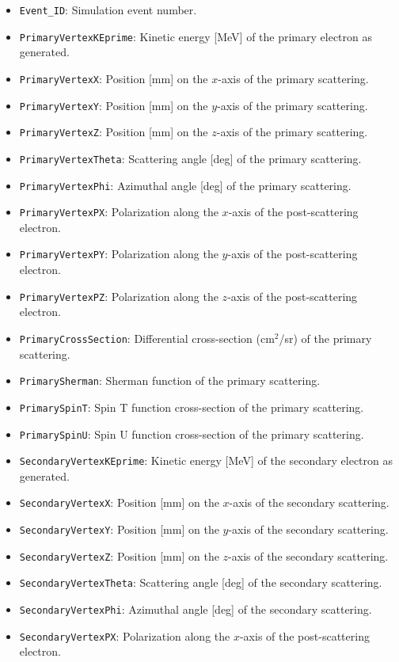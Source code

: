 \documentclass[11pt]{article}
\begin{document}
\begin{itemize}
 \item \texttt{Event\_ID}: Simulation event number.
 \item \texttt{PrimaryVertexKEprime}: Kinetic energy [MeV] of the primary electron as generated.
 \item \texttt{PrimaryVertexX}: Position [mm] on the $x$-axis of the primary scattering.
 \item \texttt{PrimaryVertexY}: Position [mm] on the $y$-axis of the primary scattering.
 \item \texttt{PrimaryVertexZ}: Position [mm] on the $z$-axis of the primary scattering.
 \item \texttt{PrimaryVertexTheta}: Scattering angle [deg] of the primary scattering.
 \item \texttt{PrimaryVertexPhi}: Azimuthal angle [deg] of the primary scattering.
 \item \texttt{PrimaryVertexPX}: Polarization along the $x$-axis of the post-scattering electron.
 \item \texttt{PrimaryVertexPY}: Polarization along the $y$-axis of the post-scattering electron.
 \item \texttt{PrimaryVertexPZ}: Polarization along the $z$-axis of the post-scattering electron.
 \item \texttt{PrimaryCrossSection}: Differential cross-section (cm$^2$/sr) of the primary scattering.
 \item \texttt{PrimarySherman}: Sherman function of the primary scattering.
 \item \texttt{PrimarySpinT}: Spin T function cross-section of the primary scattering.
 \item \texttt{PrimarySpinU}: Spin U function cross-section of the primary scattering.
 \item \texttt{SecondaryVertexKEprime}: Kinetic energy [MeV] of the secondary electron as generated.
 \item \texttt{SecondaryVertexX}: Position [mm] on the $x$-axis of the secondary scattering.
 \item \texttt{SecondaryVertexY}: Position [mm] on the $y$-axis of the secondary scattering.
 \item \texttt{SecondaryVertexZ}: Position [mm] on the $z$-axis of the secondary scattering.
 \item \texttt{SecondaryVertexTheta}: Scattering angle [deg] of the secondary scattering.
 \item \texttt{SecondaryVertexPhi}: Azimuthal angle [deg] of the secondary scattering.
 \item \texttt{SecondaryVertexPX}: Polarization along the $x$-axis of the post-scattering electron.

\end{itemize}
\end{document}
